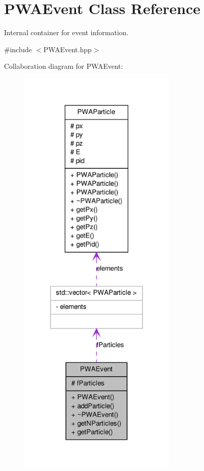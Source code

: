\hypertarget{classPWAEvent}{
\section{PWAEvent Class Reference}
\label{dc/d66/classPWAEvent}
}


Internal container for event information.  




{\ttfamily \#include $<$PWAEvent.hpp$>$}



Collaboration diagram for PWAEvent:\nopagebreak
\begin{figure}[H]
\begin{center}
\leavevmode
\includegraphics[width=216pt]{de/def/classPWAEvent__coll__graph}
\end{center}
\end{figure}
